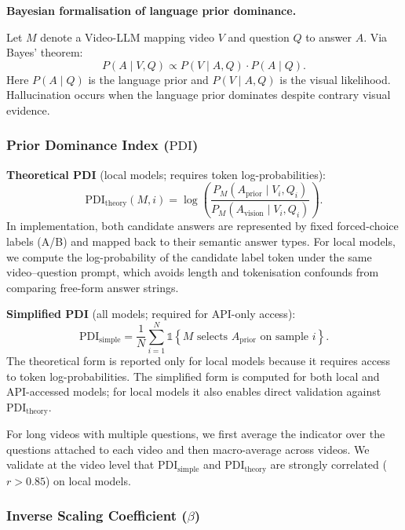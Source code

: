 \documentclass[final,5p,times,twocolumn]{elsarticle}
\newcommand{\PDI}{\mathrm{PDI}}
\newcommand{\Aprior}{A_{\mathrm{prior}}}
\newcommand{\Avision}{A_{\mathrm{vision}}}
\begin{document}
\noindent\textbf{Bayesian formalisation of language prior dominance.}

Let $M$ denote a Video-LLM mapping video $V$ and question $Q$ to answer
$A$. Via Bayes' theorem:
\[
 P(A \mid V, Q) \propto P(V \mid A, Q)\cdot P(A \mid Q).
\]
Here $P(A \mid Q)$ is the language prior and $P(V \mid A, Q)$
is the visual likelihood. Hallucination occurs when the language prior
dominates despite contrary visual evidence.

\subsubsection{Prior Dominance Index ($\PDI$)}

\noindent\textbf{Theoretical PDI} (local models; requires token log-probabilities):
\begin{equation}
 \PDI_{\mathrm{theory}}(M,i)
 = \log\!\left(
  \frac{P_M(\Aprior \mid V_i, Q_i)}{P_M(\Avision \mid V_i, Q_i)}
  \right).
 \label{eq:pdi_theory}
\end{equation}
In implementation, both candidate answers are represented by fixed
forced-choice labels (A/B) and mapped back to their semantic answer
types. For local models, we compute the log-probability of the candidate
label token under the same video--question prompt, which avoids length
and tokenisation confounds from comparing free-form answer strings.

\noindent\textbf{Simplified PDI} (all models; required for API-only access):
\begin{equation}
 \PDI_{\mathrm{simple}}
 = \frac{1}{N}\sum_{i=1}^{N}
  \mathds{1}\!\left\{M \text{ selects } \Aprior
      \text{ on sample } i\right\}.
 \label{eq:pdi_simple}
\end{equation}
The theoretical form is reported only for local models because it requires
access to token log-probabilities. The simplified form is computed for both
local and API-accessed models; for local models it also enables direct
validation against $\PDI_{\mathrm{theory}}$.

For long videos with multiple questions, we first average the indicator
over the questions attached to each video and then macro-average across
videos.
We validate at the video level that $\PDI_{\mathrm{simple}}$ and
$\PDI_{\mathrm{theory}}$ are strongly correlated ($r>0.85$) on local models.

\subsubsection{Inverse Scaling Coefficient ($\beta$)}
\end{document}
